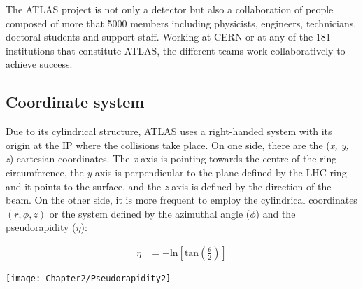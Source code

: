  
The ATLAS project is not only a detector but also a collaboration of people composed of 
more that 5000 members including physicists, engineers, technicians, doctoral students 
and support staff. Working at CERN or at any of the 181 institutions that constitute ATLAS,
the different teams work collaboratively to achieve success.  %
 
 


\subsection{Coordinate system}
\label{sec:Chap2:ATLAS:CoordinateSystem}
Due to its cylindrical structure, ATLAS uses a right-handed system with its origin at the IP where the collisions take place. 
On one side, there are the (\textit{x, y, z}) cartesian coordinates. The \textit{x}-axis is pointing towards the centre of the ring 
circumference, the \textit{y}-axis is perpendicular to the plane defined by the LHC ring and it points to the surface, and the \textit{z}-axis
is defined by the direction of the beam. 
On the other side, it is more frequent to employ the cylindrical coordinates $(r, \phi, z)$ or the system defined by the azimuthal angle ($\phi$)
and the pseudorapidity ($\eta$):

\noindent
\begin{minipage}{.45\textwidth}
\begin{align*}
	\eta &= -\textrm{ln}  \left[ \textrm{tan} \left( \frac{\theta}{2}\right) \right]
\end{align*}
\end{minipage}
\begin{minipage}{.45\textwidth}
  \centering
 	 \texttt{[image: Chapter2/Pseudorapidity2]}
\end{minipage}

